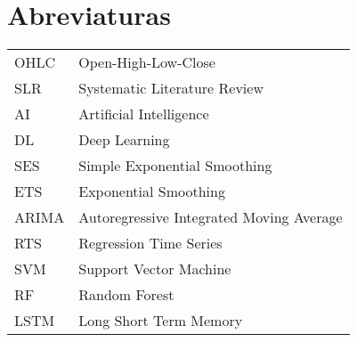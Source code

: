 \chapter*{Abreviaturas}\label{LstAbb} 

\begin{flushleft}
\begin{longtable}{lp{11cm}}

OHLC & Open-High-Low-Close\\
SLR & Systematic Literature Review\\	
AI & Artificial Intelligence \\
DL & Deep Learning \\
SES & Simple Exponential Smoothing\\
ETS & Exponential Smoothing\\
ARIMA & Autoregressive Integrated Moving Average\\
RTS & Regression Time Series\\
SVM & Support Vector Machine\\
RF & Random Forest\\
LSTM & Long Short Term Memory\\

\end{longtable}
\end{flushleft}

